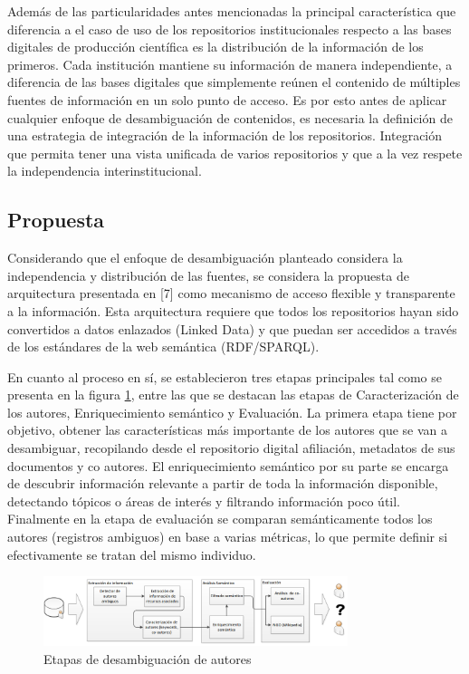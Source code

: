 \documentclass[conference]{IEEEtran}
\begin{document}
Además de las particularidades antes mencionadas la principal característica que diferencia a el caso de uso de los repositorios institucionales respecto a las bases digitales de producción científica  es la distribución de la información de los primeros. Cada institución mantiene su información de manera independiente, a diferencia de las bases digitales que simplemente reúnen el contenido de múltiples fuentes de información en un solo punto de acceso. Es por esto antes de aplicar cualquier enfoque de desambiguación de contenidos, es necesaria la definición de una estrategia de integración de la información de los repositorios. Integración que permita tener una vista unificada de varios repositorios y que a la vez respete la independencia interinstitucional. 

\subsection{Propuesta}
Considerando que el enfoque de desambiguación planteado  considera la independencia y distribución  de las fuentes, se considera la propuesta de arquitectura presentada en [7] como mecanismo de acceso flexible y transparente a la información.  Esta arquitectura requiere que todos los repositorios hayan sido convertidos a datos enlazados (Linked Data) y que puedan ser accedidos a través de los estándares de la web semántica (RDF/SPARQL).

En cuanto al proceso en sí, se establecieron tres etapas principales tal como se presenta en la figura \ref{fig:etapas}, entre las que se destacan las etapas de  Caracterización de los autores, Enriquecimiento semántico y Evaluación. La primera etapa tiene por objetivo, obtener las características más importante de los autores que se van a desambiguar, recopilando desde el repositorio digital afiliación, metadatos de sus documentos y co autores. El enriquecimiento semántico por su parte se encarga de descubrir información relevante a partir de toda la información disponible, detectando tópicos o áreas de interés y filtrando información poco útil. Finalmente en la etapa de evaluación se comparan semánticamente todos los autores (registros ambiguos) en base a varias métricas, lo que permite definir si efectivamente se tratan del mismo individuo. 

\begin{figure}[!t]
\centering
\includegraphics[width=3.5in]{arquitectura}
\caption{Etapas de desambiguaci\'on de autores}
\label{fig:etapas}
\end{figure}
\end{document}
